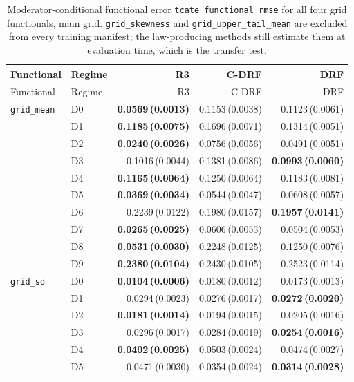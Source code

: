 \begingroup
\tiny
\setlength{\tabcolsep}{2.6pt}
\begin{longtable}{@{}llrrr@{}}
\caption{Moderator-conditional functional error \texttt{tcate\_functional\_rmse} for all four grid functionals, main grid. \texttt{grid\_skewness} and \texttt{grid\_upper\_tail\_mean} are excluded from every training manifest; the law-producing methods still estimate them at evaluation time, which is the transfer test.}\label{tab:all-tcate}\\
\toprule
Functional & Regime & R3 & C-DRF & DRF \\
\midrule
\endfirsthead
\toprule
Functional & Regime & R3 & C-DRF & DRF \\
\midrule
\endhead
\bottomrule
\endfoot
\texttt{grid\_mean} & D0 & \textbf{0.0569\,(0.0013)} & 0.1153\,(0.0038) & 0.1123\,(0.0061) \\
 & D1 & \textbf{0.1185\,(0.0075)} & 0.1696\,(0.0071) & 0.1314\,(0.0051) \\
 & D2 & \textbf{0.0240\,(0.0026)} & 0.0756\,(0.0056) & 0.0491\,(0.0051) \\
 & D3 & 0.1016\,(0.0044) & 0.1381\,(0.0086) & \textbf{0.0993\,(0.0060)} \\
 & D4 & \textbf{0.1165\,(0.0064)} & 0.1250\,(0.0064) & 0.1183\,(0.0081) \\
 & D5 & \textbf{0.0369\,(0.0034)} & 0.0544\,(0.0047) & 0.0608\,(0.0057) \\
 & D6 & 0.2239\,(0.0122) & 0.1980\,(0.0157) & \textbf{0.1957\,(0.0141)} \\
 & D7 & \textbf{0.0265\,(0.0025)} & 0.0606\,(0.0053) & 0.0504\,(0.0053) \\
 & D8 & \textbf{0.0531\,(0.0030)} & 0.2248\,(0.0125) & 0.1250\,(0.0076) \\
 & D9 & \textbf{0.2380\,(0.0104)} & 0.2430\,(0.0105) & 0.2523\,(0.0114) \\
\midrule
\texttt{grid\_sd} & D0 & \textbf{0.0104\,(0.0006)} & 0.0180\,(0.0012) & 0.0173\,(0.0013) \\
 & D1 & 0.0294\,(0.0023) & 0.0276\,(0.0017) & \textbf{0.0272\,(0.0020)} \\
 & D2 & \textbf{0.0181\,(0.0014)} & 0.0194\,(0.0015) & 0.0205\,(0.0016) \\
 & D3 & 0.0296\,(0.0017) & 0.0284\,(0.0019) & \textbf{0.0254\,(0.0016)} \\
 & D4 & \textbf{0.0402\,(0.0025)} & 0.0503\,(0.0024) & 0.0474\,(0.0027) \\
 & D5 & 0.0471\,(0.0030) & 0.0354\,(0.0024) & \textbf{0.0314\,(0.0028)} \\

\end{longtable}
